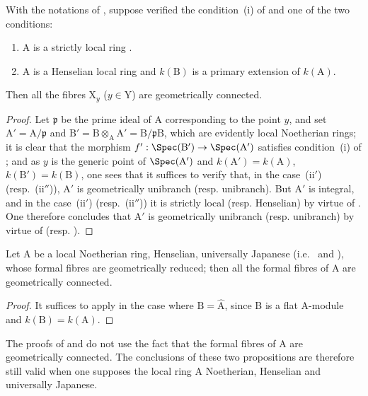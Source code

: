 \begin{corollary}[18.9.8]
\label{IV.18.9.8}
With the notations of , suppose verified the condition~(i) of  and one of the two conditions:
\begin{enumerate}
  \item[\rm(ii$'$)] A is a strictly local ring .
  \item[\rm(ii$''$)] A is a Henselian local ring and $k(\mathrm{B})$ is a primary extension of $k(\mathrm{A})$.
\end{enumerate}
Then all the fibres $\mathrm{X}_y$ ($y\in\mathrm{Y}$) are geometrically connected.
\end{corollary}

\begin{proof}
Let $\mathfrak{p}$ be the prime ideal of A corresponding to the point $y$, and set $\mathrm{A}'=\mathrm{A}/\mathfrak{p}$ and $\mathrm{B}'=\mathrm{B}\otimes_{\mathrm{A}}\mathrm{A}'=\mathrm{B}/\mathfrak{p}\mathrm{B}$, which are evidently local Noetherian rings;
it is clear that the morphism $f':\Spec(\mathrm{B}')\to\Spec(\mathrm{A}')$ satisfies condition~(i) of ;
and as $y$ is the generic point of $\Spec(\mathrm{A}')$ and $k(\mathrm{A}')=k(\mathrm{A})$, $k(\mathrm{B}')=k(\mathrm{B})$, one sees that it suffices to verify that, in the case~(ii$'$) (resp.~(ii$''$)), $\mathrm{A}'$ is geometrically unibranch (resp. unibranch).
But $\mathrm{A}'$ is integral, and in the case~(ii$'$) (resp.~(ii$''$)) it is strictly local (resp. Henselian) by virtue of .
One therefore concludes that $\mathrm{A}'$ is geometrically unibranch (resp. unibranch) by virtue of  (resp. ).
\end{proof}

\begin{corollary}[18.9.9]
\label{IV.18.9.9}
Let $\mathrm{A}$ be a local Noetherian ring, Henselian, universally Japanese (i.e.~ and ), whose formal fibres  are geometrically reduced;
then all the formal fibres of A are geometrically connected.
\end{corollary}

\begin{proof}
It suffices to apply  in the case where $\mathrm{B}=\hat{\mathrm{A}}$, since B is a flat A-module and $k(\mathrm{B})=k(\mathrm{A})$.
\end{proof}

\begin{remark}[18.9.10]
\label{IV.18.9.10}
The proofs of  and  do not use the fact that the formal fibres of A are geometrically connected.
The conclusions
of these two propositions are therefore still valid when one supposes the local ring A Noetherian, Henselian and universally Japanese.
\end{remark}

